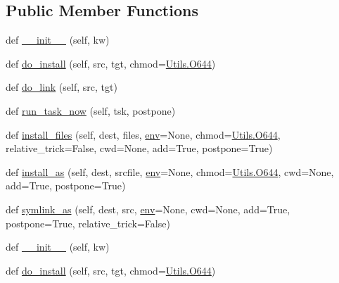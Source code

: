 \subsection*{Public Member Functions}
\begin{DoxyCompactItemize}
\item 
def \hyperlink{classwaflib_1_1_build_1_1_install_context_a92d1f07459687e8da5a0e871eeb462f0}{\+\_\+\+\_\+init\+\_\+\+\_\+} (self, kw)
\item 
def \hyperlink{classwaflib_1_1_build_1_1_install_context_a389ce541ae521e6e4e616cfddf89bd7e}{do\+\_\+install} (self, src, tgt, chmod=\hyperlink{namespacewaflib_1_1_utils_ade9dd27fadbf52a0641bbff06d3dd3ac}{Utils.\+O644})
\item 
def \hyperlink{classwaflib_1_1_build_1_1_install_context_ac012afc7dd8fb657141d28ad571392f4}{do\+\_\+link} (self, src, tgt)
\item 
def \hyperlink{classwaflib_1_1_build_1_1_install_context_ab9691686f803c54151ec5bbc92717a0f}{run\+\_\+task\+\_\+now} (self, tsk, postpone)
\item 
def \hyperlink{classwaflib_1_1_build_1_1_install_context_af07f1f67998c0f4a6d20361cd28ee0bc}{install\+\_\+files} (self, dest, files, \hyperlink{classwaflib_1_1_build_1_1_build_context_ac3b464a969bc6c898c739b6d820b2219}{env}=None, chmod=\hyperlink{namespacewaflib_1_1_utils_ade9dd27fadbf52a0641bbff06d3dd3ac}{Utils.\+O644}, relative\+\_\+trick=False, cwd=None, add=True, postpone=True)
\item 
def \hyperlink{classwaflib_1_1_build_1_1_install_context_a7a653c97bec879bfd813d525c8c0caf3}{install\+\_\+as} (self, dest, srcfile, \hyperlink{classwaflib_1_1_build_1_1_build_context_ac3b464a969bc6c898c739b6d820b2219}{env}=None, chmod=\hyperlink{namespacewaflib_1_1_utils_ade9dd27fadbf52a0641bbff06d3dd3ac}{Utils.\+O644}, cwd=None, add=True, postpone=True)
\item 
def \hyperlink{classwaflib_1_1_build_1_1_install_context_a25a3977cdde84cb8b06ce8316acc686b}{symlink\+\_\+as} (self, dest, src, \hyperlink{classwaflib_1_1_build_1_1_build_context_ac3b464a969bc6c898c739b6d820b2219}{env}=None, cwd=None, add=True, postpone=True, relative\+\_\+trick=False)
\item 
def \hyperlink{classwaflib_1_1_build_1_1_install_context_a92d1f07459687e8da5a0e871eeb462f0}{\+\_\+\+\_\+init\+\_\+\+\_\+} (self, kw)
\item 
def \hyperlink{classwaflib_1_1_build_1_1_install_context_a389ce541ae521e6e4e616cfddf89bd7e}{do\+\_\+install} (self, src, tgt, chmod=\hyperlink{namespacewaflib_1_1_utils_ade9dd27fadbf52a0641bbff06d3dd3ac}{Utils.\+O644})

\end{DoxyCompactItemize}
